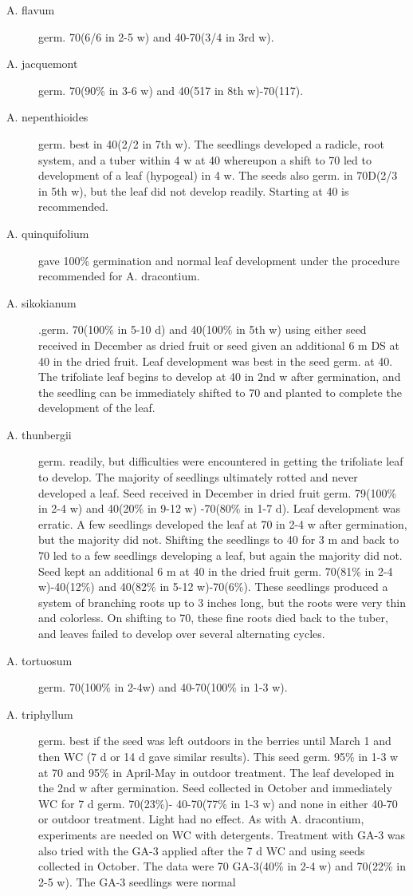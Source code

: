 \begin{description}
\item[A. flavum] germ. 70(6/6 in 2-5 w) and 40-70(3/4 in 3rd w).
\item[A. jacquemont] germ. 70(90\% in 3-6 w) and 40(517 in 8th w)-70(117).
\item[A. nepenthioides] germ. best in 40(2/2 in 7th w). The seedlings developed a
radicle, root system, and a tuber within 4 w at 40 whereupon a shift to 70 led to
development of a leaf (hypogeal) in 4 w. The seeds also germ. in 70D(2/3 in 5th w),
but the leaf did not develop readily. Starting at 40 is recommended.
\item[A. quinquifolium] gave 100\% germination and normal leaf development under
the procedure recommended for A. dracontium.
\item[A. sikokianum] .germ. 70(100\% in 5-10 d) and 40(100\% in 5th w) using either
seed received in December as dried fruit or seed given an additional 6 m DS at 40 in
the dried fruit. Leaf development was best in the seed germ. at 40. The trifoliate leaf
begins to develop at 40 in 2nd w after germination, and the seedling can be
immediately shifted to 70 and planted to complete the development of the leaf.
\item[A. thunbergii] germ. readily, but difficulties were encountered in getting the
trifoliate leaf to develop. The majority of seedlings ultimately rotted and never
developed a leaf. Seed received in December in dried fruit germ. 79(100\% in 2-4 w)
and 40(20\% in 9-12 w) -70(80\% in 1-7 d). Leaf development was erratic. A few
seedlings developed the leaf at 70 in 2-4 w after germination, but the majority did not.
Shifting the seedlings to 40 for 3 m and back to 70 led to a few seedlings developing a
leaf, but again the majority did not. Seed kept an additional 6 m at 40 in the dried fruit
germ. 70(81\% in 2-4 w)-40(12\%) and 40(82\% in 5-12 w)-70(6\%). These seedlings
produced a system of branching roots up to 3 inches long, but the roots were very thin
and colorless. On shifting to 70, these fine roots died back to the tuber, and leaves
failed to develop over several alternating cycles.
\item[A. tortuosum] germ. 70(100\% in 2-4w) and 40-70(100\% in 1-3 w).
\item[A. triphyllum] germ. best if the seed was left outdoors in the berries until March 1
and then WC (7 d or 14 d gave similar results). This seed germ. 95\% in 1-3 w at 70
and 95\% in April-May in outdoor treatment. The leaf developed in the 2nd w after
germination. Seed collected in October and immediately WC for 7 d germ. 70(23\%)-
40-70(77\% in 1-3 w) and none in either 40-70 or outdoor treatment. Light had no
effect. As with A. dracontium, experiments are needed on WC with detergents.
Treatment with GA-3 was also tried with the GA-3 applied after the 7 d WC and using
seeds collected in October. The data were 70 GA-3(40\% in 2-4 w) and 70(22\% in 2-5
w). The GA-3 seedlings were normal


\end{description}
